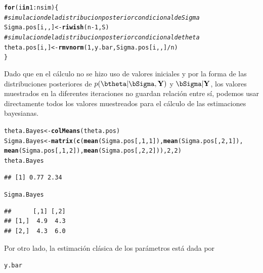 \documentclass[10pt,openright]{book}\usepackage[]{graphicx}\usepackage[]{color}
\makeatletter
\newcommand{\hlnum}[1]{\textcolor[rgb]{0.686,0.059,0.569}{#1}}%
\newcommand{\hlcom}[1]{\textcolor[rgb]{0.678,0.584,0.686}{\textit{#1}}}%
\newcommand{\hlopt}[1]{\textcolor[rgb]{0,0,0}{#1}}%
\newcommand{\hlstd}[1]{\textcolor[rgb]{0.345,0.345,0.345}{#1}}%
\newcommand{\hlkwa}[1]{\textcolor[rgb]{0.161,0.373,0.58}{\textbf{#1}}}%
\newcommand{\hlkwb}[1]{\textcolor[rgb]{0.69,0.353,0.396}{#1}}%
\newcommand{\hlkwd}[1]{\textcolor[rgb]{0.737,0.353,0.396}{\textbf{#1}}}%
\newenvironment{kframe}{%
 \def\at@end@of@kframe{}%
 \ifinner\ifhmode%
  \def\at@end@of@kframe{\end{minipage}}%
  \begin{minipage}{\columnwidth}%
 \fi\fi%
 \def\FrameCommand##1{\hskip\@totalleftmargin \hskip-\fboxsep
 \colorbox{shadecolor}{##1}\hskip-\fboxsep
     \hskip-\linewidth \hskip-\@totalleftmargin \hskip\columnwidth}%
 \MakeFramed {\advance\hsize-\width
   \@totalleftmargin\z@ \linewidth\hsize
   \@setminipage}}%
 {\par\unskip\endMakeFramed%
 \at@end@of@kframe}
\newenvironment{knitrout}{}{} %
\makeatother
\begin{document}
\begin{Eje}
\begin{knitrout}
\begin{kframe}
\begin{alltt}
\hlkwa{for}\hlstd{(i} \hlkwa{in} \hlnum{1}\hlopt{:}\hlstd{nsim)\{}
  \hlcom{#simulacion de la distribucion posterior condicional de Sigma}
  \hlstd{Sigma.pos[i,,]} \hlkwb{<-} \hlkwd{riwish}\hlstd{(n}\hlopt{-}\hlnum{1}\hlstd{, S)}
  \hlcom{#simulacion de la distribucion posterior condicional de theta}
  \hlstd{theta.pos[i,]} \hlkwb{<-} \hlkwd{rmvnorm}\hlstd{(}\hlnum{1}\hlstd{, y.bar, Sigma.pos[i,,]}\hlopt{/}\hlstd{n)}
\hlstd{\}}
\end{alltt}
\end{kframe}
\end{knitrout}
Dado que en el c\'alculo no se hizo uso de valores iniciales y por la forma de las distribuciones posteriores de $p(\btheta|\bSigma,\mathbf{Y})$ y $\bSigma|\mathbf{Y}$, los valores muestrados en la diferentes iteraciones no guardan relaci\'on entre s\'i, podemos usar directamente todos los valores muestreados para el c\'alculo de las estimaciones bayesianas.
\begin{knitrout}
\color{fgcolor}\begin{kframe}
\begin{alltt}
\hlstd{theta.Bayes} \hlkwb{<-} \hlkwd{colMeans}\hlstd{(theta.pos)}
\hlstd{Sigma.Bayes} \hlkwb{<-} \hlkwd{matrix}\hlstd{(}\hlkwd{c}\hlstd{(}\hlkwd{mean}\hlstd{(Sigma.pos[,}\hlnum{1}\hlstd{,}\hlnum{1}\hlstd{]),}\hlkwd{mean}\hlstd{(Sigma.pos[,}\hlnum{2}\hlstd{,}\hlnum{1}\hlstd{]),}
                        \hlkwd{mean}\hlstd{(Sigma.pos[,}\hlnum{1}\hlstd{,}\hlnum{2}\hlstd{]),}\hlkwd{mean}\hlstd{(Sigma.pos[,}\hlnum{2}\hlstd{,}\hlnum{2}\hlstd{])),} \hlnum{2}\hlstd{,} \hlnum{2}\hlstd{)}
\hlstd{theta.Bayes}
\end{alltt}
\begin{verbatim}
## [1] 0.77 2.34
\end{verbatim}
\begin{alltt}
\hlstd{Sigma.Bayes}
\end{alltt}
\begin{verbatim}
##      [,1] [,2]
## [1,]  4.9  4.3
## [2,]  4.3  6.0
\end{verbatim}
\end{kframe}
\end{knitrout}
Por otro lado, la estimaci\'on cl\'asica de los par\'ametros est\'a dada por
\begin{knitrout}
\color{fgcolor}\begin{kframe}
\begin{alltt}
\hlstd{y.bar}
\end{alltt}

\end{kframe}
\end{knitrout}
\end{Eje}
\end{document}
